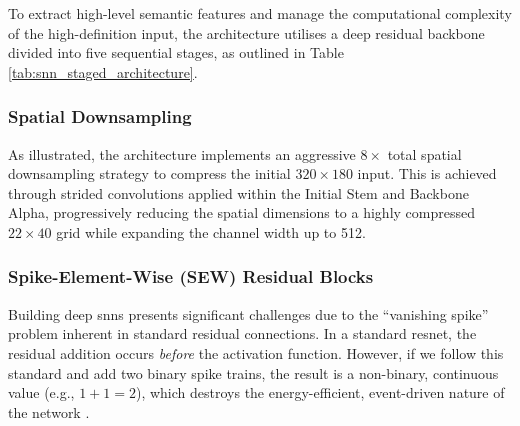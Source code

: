 To extract high-level semantic features and manage the computational complexity of the high-definition input, the architecture utilises a deep residual backbone divided into five sequential stages, as outlined in Table \ref{tab:snn_staged_architecture}.

\begin{table}[htbp]
\centering
{}
\caption[Network Architecture Stages]{Detailed breakdown of the five sequential stages in the \texttt{DetectorNX-G3-SNN} backbone.}
\label{tab:snn_staged_architecture}
\end{table}

\subsubsection{Spatial Downsampling}
As illustrated, the architecture implements an aggressive $8\times$ total spatial downsampling strategy to compress the initial $320 \times 180$ input.
This is achieved through strided convolutions applied within the Initial Stem and Backbone Alpha, progressively reducing the spatial dimensions to a highly compressed $22 \times 40$ grid while expanding the channel width up to 512.

\subsubsection{Spike-Element-Wise (SEW) Residual Blocks}
Building deep \glspl{snn} presents significant challenges due to the ``vanishing spike'' problem inherent in standard residual connections. 
In a standard \gls{resnet}, the residual addition occurs \textit{before} the activation function.
However, if we follow this standard and add two binary spike trains, the result is a non-binary, continuous value (e.g., $1+1=2$), which destroys the energy-efficient, event-driven nature of the network \cite{fang2022resnet_sew}.

